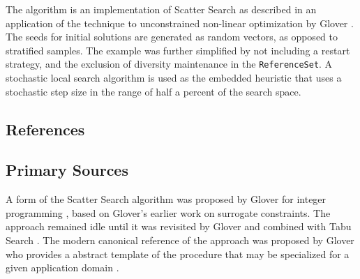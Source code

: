 The algorithm is an implementation of Scatter Search as described in an application of the technique to unconstrained non-linear optimization by Glover \cite{Glover2003b}. The seeds for initial solutions are generated as random vectors, as opposed to stratified samples. The example was further simplified by not including a restart strategy, and the exclusion of diversity maintenance in the \texttt{ReferenceSet}. A stochastic local search algorithm is used as the embedded heuristic that uses a stochastic step size in the range of half a percent of the search space.



\subsection{References}

% 
% 
\subsection{Primary Sources}
A form of the Scatter Search algorithm was proposed by Glover for integer programming \cite{Glover1977}, based on Glover's earlier work on surrogate constraints.
The approach remained idle until it was revisited by Glover and combined with Tabu Search \cite{Glover1994a}.
The modern canonical reference of the approach was proposed by Glover who provides a abstract template of the procedure that may be specialized for a given application domain \cite{Glover1998a}. 

% 
% 
